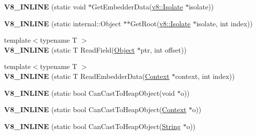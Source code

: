 \begin{DoxyCompactItemize}
\item 
\hypertarget{classv8_1_1internal_1_1_internals_acb49ba730133da0d6a473f199a29f2d8}{}{\bfseries V8\+\_\+\+I\+N\+L\+I\+N\+E} (static void $\ast$Get\+Embedder\+Data(\hyperlink{classv8_1_1_isolate}{v8\+::\+Isolate} $\ast$isolate))\label{classv8_1_1internal_1_1_internals_acb49ba730133da0d6a473f199a29f2d8}

\item 
\hypertarget{classv8_1_1internal_1_1_internals_a43d16f21d492bab553ecbe80930b7cf8}{}{\bfseries V8\+\_\+\+I\+N\+L\+I\+N\+E} (static internal\+::\+Object $\ast$$\ast$Get\+Root(\hyperlink{classv8_1_1_isolate}{v8\+::\+Isolate} $\ast$isolate, int index))\label{classv8_1_1internal_1_1_internals_a43d16f21d492bab553ecbe80930b7cf8}

\item 
\hypertarget{classv8_1_1internal_1_1_internals_a07da7e32f4f7ee58846b6f54f6785ed3}{}{\footnotesize template$<$typename T $>$ }\\{\bfseries V8\+\_\+\+I\+N\+L\+I\+N\+E} (static T Read\+Field(\hyperlink{classv8_1_1_object}{Object} $\ast$ptr, int offset))\label{classv8_1_1internal_1_1_internals_a07da7e32f4f7ee58846b6f54f6785ed3}

\item 
\hypertarget{classv8_1_1internal_1_1_internals_a065d87c2ee41c1a93c59ca9b3cc361dd}{}{\footnotesize template$<$typename T $>$ }\\{\bfseries V8\+\_\+\+I\+N\+L\+I\+N\+E} (static T Read\+Embedder\+Data(\hyperlink{classv8_1_1_context}{Context} $\ast$context, int index))\label{classv8_1_1internal_1_1_internals_a065d87c2ee41c1a93c59ca9b3cc361dd}

\item 
\hypertarget{classv8_1_1internal_1_1_internals_a37bdb8bc6f18868b28b81238103ec04a}{}{\bfseries V8\+\_\+\+I\+N\+L\+I\+N\+E} (static bool Can\+Cast\+To\+Heap\+Object(void $\ast$o))\label{classv8_1_1internal_1_1_internals_a37bdb8bc6f18868b28b81238103ec04a}

\item 
\hypertarget{classv8_1_1internal_1_1_internals_a14d1baa0483d1c63ddb360e47766581a}{}{\bfseries V8\+\_\+\+I\+N\+L\+I\+N\+E} (static bool Can\+Cast\+To\+Heap\+Object(\hyperlink{classv8_1_1_context}{Context} $\ast$o))\label{classv8_1_1internal_1_1_internals_a14d1baa0483d1c63ddb360e47766581a}

\item 
\hypertarget{classv8_1_1internal_1_1_internals_a42a605e97d72df73beff0010551260b5}{}{\bfseries V8\+\_\+\+I\+N\+L\+I\+N\+E} (static bool Can\+Cast\+To\+Heap\+Object(\hyperlink{classv8_1_1_string}{String} $\ast$o))\label{classv8_1_1internal_1_1_internals_a42a605e97d72df73beff0010551260b5}


\end{DoxyCompactItemize}
